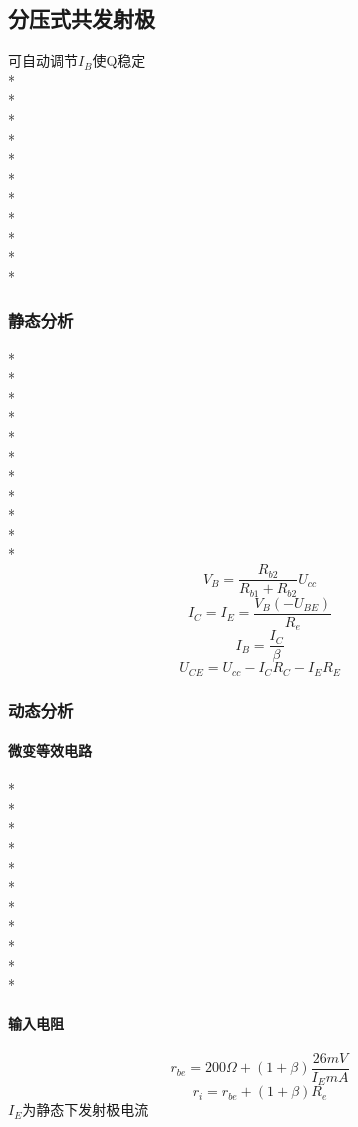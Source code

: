 \documentclass[UTF8, fontset=none]{ctexart}
\begin{document}
\begin{multicols*}{8}
\subsection{分压式共发射极}
可自动调节$I_B$使Q稳定\\%
*\\
*\\
*\\
*\\
*\\
*\\
*\\
*\\
*\\
*\\
*
\subsubsection{静态分析}
*\\
*\\
*\\
*\\
*\\
*\\
*\\
*\\
*\\
*\\
*\\
\[V_B = \frac{R_{b2}}{R_{b1} + R_{b2}} U_{cc}\]
\[I_C = I_E = \frac{V_B (- U_{BE})}{R_e}\]
\[I_B = \frac{I_C}{\beta}\]
\[U_{CE} = U_{cc} - I_C R_C - I_E R_E\]
\subsubsection{动态分析}
\paragraph{微变等效电路}
*\\
*\\
*\\
*\\
*\\
*\\
*\\
*\\
*\\
*\\
*
\paragraph{输入电阻}
\[r_{be} = 200\Omega + (1 + \beta)\frac{26 mV}{I_E mA}\]
\[r_i = r_{be} +(1 + \beta)R_e\]
$I_E$为静态下发射极电流

\end{multicols*}
\end{document}
